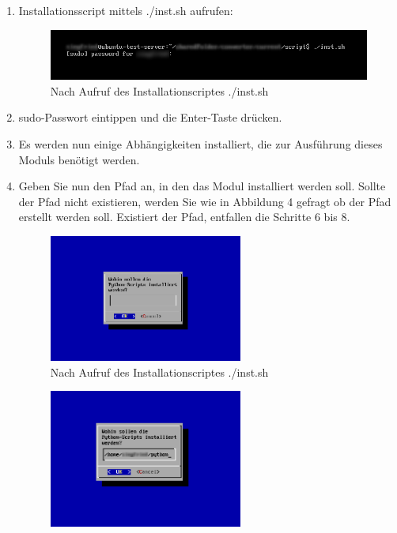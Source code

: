 \documentclass[12pt]{scrartcl}
\begin{document}
\begin{enumerate}
\item Installationsscript mittels ./inst.sh aufrufen:
\newline
\begin{figure}[htbp]
\includegraphics[width=1.0\textwidth]{schritt1}\par\vspace{0.5cm}
\caption{Nach Aufruf des Installationscriptes ./inst.sh}
\label{fig:script1}
\end{figure}
\item sudo-Passwort eintippen und die Enter-Taste drücken.
\item Es werden nun einige Abhängigkeiten installiert, die 
zur Ausführung dieses Moduls benötigt werden.
\newpage
\item Geben Sie nun den Pfad an, in den das Modul installiert werden soll.
Sollte der Pfad nicht existieren, werden Sie wie in Abbildung 4 gefragt
ob der Pfad erstellt werden soll. 
Existiert der Pfad, entfallen die Schritte 6 bis 8. 
\begin{figure}[htbp]
\centering
\includegraphics[width=0.6\textwidth]{schritt2}\par\vspace{0.5cm}
\caption{Nach Aufruf des Installationscriptes ./inst.sh}
\label{fig:script2}
\end{figure}
\begin{figure}[htbp]
\centering
\includegraphics[width=0.6\textwidth]{schritt3}\par\vspace{0.5cm}

\end{figure}
\end{enumerate}
\end{document}

